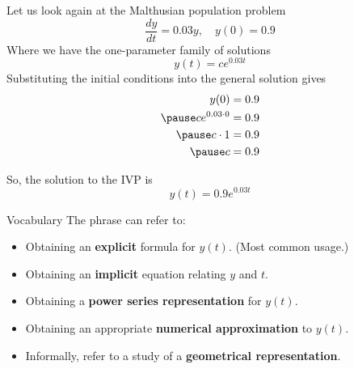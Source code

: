 \documentclass{beamer}
\begin{document}
\begin{frame}
\begin{example}
Let us look again at the Malthusian population problem
\begin{equation*}
\dfrac{dy}{dt}=0.03y,\quad y(0)=0.9
\end{equation*}
Where we have the one-parameter family of solutions
\begin{equation*}
y(t)=ce^{0.03t}
\end{equation*}\pause
Substituting the initial conditions into the general solution gives
\begin{equation*}
\begin{aligned}
y(0) &= 0.9 \\ \pause
ce^{0.03\cdot 0} &= 0.9 \\ \pause
c\cdot 1 &= 0.9 \\ \pause
c &= 0.9
\end{aligned}
\end{equation*}\pause

\vspace{-8mm}
So, the solution to the IVP is 
\begin{equation*}
y(t)=0.9e^{0.03t}
\end{equation*}
\end{example}
\end{frame}

\begin{frame}
\begin{block}{Vocabulary}
The phrase  can refer to:
\begin{itemize}[<+- | alert@+>]
\item Obtaining an \textbf{explicit} formula for $y(t)$. (Most common usage.)
\item Obtaining an \textbf{implicit} equation relating $y$ and $t$.
\item Obtaining a \textbf{power series representation} for $y(t)$.
\item Obtaining an appropriate \textbf{numerical approximation} to $y(t)$.
\item Informally, refer to a study of a \textbf{geometrical representation}.
\end{itemize}
\end{block}
\end{frame}
\end{document}
